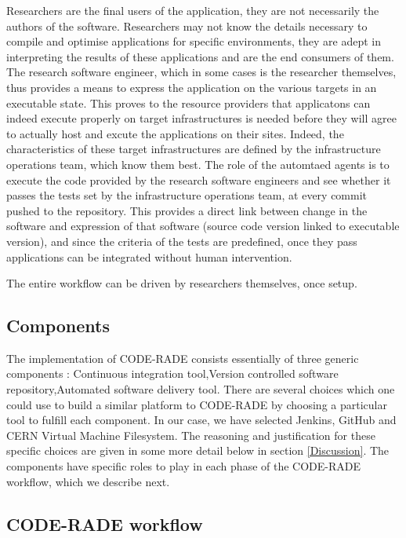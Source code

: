 \documentclass[a4paper]{jpconf}
\begin{document}
    Researchers are the final users of the application, they are not necessarily the authors of
    the software. Researchers may not know the details necessary to compile and optimise
    applications for specific environments, they are adept in interpreting the results of
    these applications and are the end consumers of them. The research software engineer, which in
    some cases is the researcher themselves, thus provides a means to express the application on the
    various targets in an executable state. This proves to the resource providers that
    applicatons can indeed execute properly on target infrastructures is needed before they will
    agree to actually host and excute the applications on their sites. Indeed, the characteristics
    of these target infrastructures are defined by the infrastructure operations team, which know
    them best. The role of the automtaed agents is to execute the code provided by the research
    software engineers and see whether it passes the tests set by the infrastructure operations
    team, at every commit pushed to the repository. This provides a direct link between change in
    the software and expression of that software (source code version linked to executable version),
    and since the criteria of the tests are predefined, once they pass applications can be integrated
    without human intervention.

	The entire workflow can be driven by researchers themselves, once setup.

	\subsection{Components}

	The implementation of CODE-RADE consists essentially of three generic components : Continuous 
    integration tool,Version controlled software repository,Automated software delivery tool.
    There are several choices  which one could use to build a similar platform to CODE-RADE by
    choosing a particular tool to fulfill each component. In our case, we have selected
    Jenkins\cite{Jenkins}, GitHub\cite{Github} and CERN Virtual Machine Filesystem\cite{CVMFS}. The
    reasoning and justification for these specific choices are given in some more detail below in
    section \ref{Discussion}. The components have specific roles to play in each phase of the
    CODE-RADE workflow, which we describe next.

	\subsection{CODE-RADE workflow}
\end{document}
